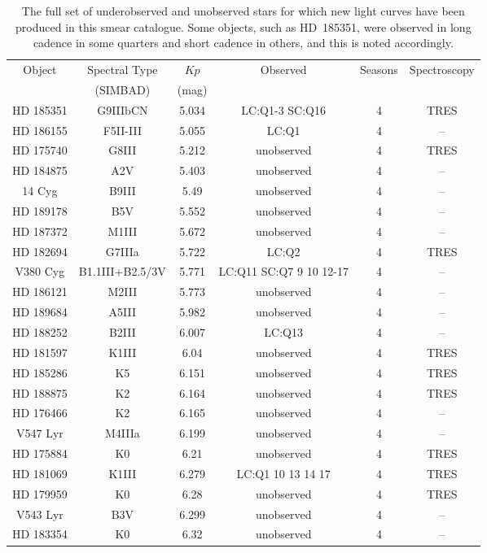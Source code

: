 \begin{table*}
\caption{The full set of underobserved and unobserved stars for which new light curves have been produced in this smear catalogue. Some objects, such as HD~185351, were observed in long cadence in some quarters and short cadence in others, and this is noted accordingly.\label{all_stars}\label{all_stars}}
\begin{tabular}{cccccc}
\hline \hline
Object & Spectral Type & $Kp$ & Observed & Seasons & Spectroscopy \\
 & (SIMBAD) & (mag) &  &  &  \\
\hline
HD 185351 & G9IIIbCN & 5.034 & LC:Q1-3 SC:Q16 & 4 & TRES \\
HD 186155 & F5II-III & 5.055 & LC:Q1 & 4 & -- \\
HD 175740 & G8III & 5.212 & unobserved & 4 & TRES \\
HD 184875 & A2V & 5.403 & unobserved & 4 & -- \\
14 Cyg & B9III & 5.49 & unobserved & 4 & -- \\
HD 189178 & B5V & 5.552 & unobserved & 4 & -- \\
HD 187372 & M1III & 5.672 & unobserved & 4 & -- \\
HD 182694 & G7IIIa & 5.722 & LC:Q2 & 4 & TRES \\
V380 Cyg & B1.1III+B2.5/3V & 5.771 & LC:Q11 SC:Q7 9 10 12-17 & 4 & -- \\
HD 186121 & M2III & 5.773 & unobserved & 4 & -- \\
HD 189684 & A5III & 5.982 & unobserved & 4 & -- \\
HD 188252 & B2III & 6.007 & LC:Q13 & 4 & -- \\
HD 181597 & K1III & 6.04 & unobserved & 4 & TRES \\
HD 185286 & K5 & 6.151 & unobserved & 4 & TRES \\
HD 188875 & K2 & 6.164 & unobserved & 4 & TRES \\
HD 176466 & K2 & 6.165 & unobserved & 4 & -- \\
V547 Lyr & M4IIIa & 6.199 & unobserved & 4 & -- \\
HD 175884 & K0 & 6.21 & unobserved & 4 & TRES \\
HD 181069 & K1III & 6.279 & LC:Q1 10 13 14 17 & 4 & TRES \\
HD 179959 & K0 & 6.28 & unobserved & 4 & TRES \\
V543 Lyr & B3V & 6.299 & unobserved & 4 & -- \\
HD 183354 & K0 & 6.32 & unobserved & 4 & -- \\

\end{tabular}
\end{table*}
